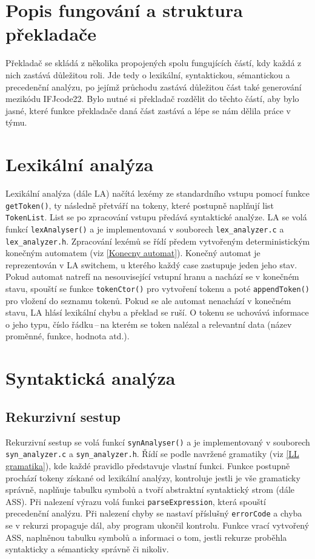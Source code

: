 \documentclass[a4paper, 12pt]{article}
\begin{document}
    \section{Popis fungování a struktura překladače}
    Překladač se skládá z několika propojených spolu fungujících částí, kdy každá z nich zastává důležitou roli. Jde tedy o lexikální, syntaktickou, sémantickou a precedenční analýzu, po jejímž průchodu zastává důležitou část také generování mezikódu IFJcode22. Bylo nutné si překladač rozdělit do těchto částí, aby bylo jasné, které funkce překladače daná část zastává a lépe se nám dělila práce v týmu.

     \section{Lexikální analýza}
    Lexikální analýza (dále LA) načítá lexémy ze standardního vstupu pomocí funkce \texttt{getToken()}, ty následně přetváří na tokeny, které postupně naplňují list \texttt{TokenList}. List se po zpracování vstupu předává syntaktické analýze. LA se volá funkcí \texttt{lexAnalyser()} a je implementovaná v souborech \texttt{lex\_analyzer.c} a \texttt{lex\_analyzer.h}. Zpracování lexémů se řídí předem vytvořeným deterministickým konečným automatem (viz \ref{Konecny automat}). Konečný automat je reprezentován v LA  switchem, u kterého každý case zastupuje jeden jeho stav. Pokud automat natrefí na nesouvisející vstupní hranu a nachází se v konečném stavu, spouští se funkce \texttt{tokenCtor()} pro vytvoření tokenu a poté \texttt{appendToken()} pro vložení do seznamu tokenů. Pokud se ale automat nenachází v konečném stavu, LA hlásí lexikální chybu a překlad se ruší. O tokenu se uchovává informace o jeho typu, číslo řádku\,--\,na kterém se token nalézal a relevantní data (název proměnné, funkce, hodnota atd.).
    \section{Syntaktická analýza}

    \subsection{Rekurzivní sestup} \label{sestup}
        Rekurzivní sestup se volá funkcí \texttt{synAnalyser()} a je implementovaný v souborech \texttt{syn\_analyzer.c} a \texttt{syn\_analyzer.h}. Řídí se podle navržené gramatiky (viz \ref{LL gramatika}), kde každé pravidlo představuje vlastní funkci. Funkce postupně prochází tokeny získané od lexikální analýzy, kontroluje jestli je vše gramaticky správně, naplňuje tabulku symbolů a tvoří abstraktní syntaktický strom (dále ASS). Při nalezení výrazu volá funkci \texttt{parseExpression}, která spouští precedenční analýzu. Při nalezení chyby se nastaví příslušný \texttt{errorCode} a chyba se v rekurzi propaguje dál, aby program ukončil kontrolu. Funkce vrací vytvořený ASS, naplněnou tabulku symbolů a informaci o tom, jestli rekurze proběhla syntakticky a sémanticky správně či nikoliv.
\end{document}
